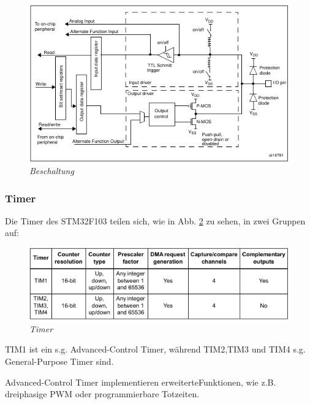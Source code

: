 \begin{figure}[h]
    \vspace{-\baselineskip}
        \centering
        \includegraphics[scale=0.6]{Pictures/gpio.png}
        \caption{\textit{Beschaltung \citep{STM32_Ref}}}
        \label{img:GPIO}
\end{figure}

\newpage


\subsubsection{Timer}
\label{subsub: Timer}

Die Timer des STM32F103 teilen sich, wie in Abb. \ref{img:Timer} zu sehen, in zwei Gruppen auf:

\vspace{0.5cm}
\begin{figure}[h]
    \vspace{-\baselineskip}
        \centering
        \includegraphics[scale=0.6]{Pictures/timer.png}
        \caption{\textit{Timer \citep{STM32_Datasheet}}}
        \label{img:Timer}
\end{figure}

TIM1 ist ein s.g. Advanced-Control Timer, während TIM2,TIM3 und TIM4 s.g. General-Purpose Timer sind. 

Advanced-Control Timer implementieren erweiterteFunktionen, wie z.B. dreiphasige PWM oder programmierbare Totzeiten\citep{STM32_Datasheet}. 

